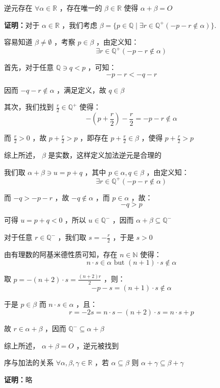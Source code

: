 \begin{theorem}{逆元存在}
$\forall\alpha\in\mathbb{R}$ ，存在唯一的 $\beta\in\mathbb{R}$ 使得 $\alpha+\beta=O$

\textbf{证明：}对于 $\alpha\in\mathbb{R}$ ，我们考虑 $\beta=\{p\in\mathbb{Q}\mid\exists r\in\mathbb{Q}^+(-p-r\notin\alpha)\}$.

容易知道 $\beta\neq \emptyset$ ，考察 $p\in\beta$ ，由定义知：
$$\exists r\in\mathbb{Q}^+(-p-r\notin\alpha)$$

首先，对于任意 $\mathbb{Q}\ni q<p$ ，可知：
$$-p-r<-q-r$$

因而 $-q-r\notin\alpha$ ，满足定义，故 $q\in\beta$

其次，我们找到 $\displaystyle{\frac{r}{2}\in\mathbb{Q}^+}$ 使得：
$$-\left(p+\frac{r}{2}\right)-\frac{r}{2}=-p-r\notin\alpha$$

而 $\displaystyle{\frac{r}{2}>0}$ ，故 $\displaystyle{p+\frac{r}{2}>p}$ ，即存在 $\displaystyle{p+\frac{r}{2}\in\beta}$ ，使得 $\displaystyle{p+\frac{r}{2}>p}$

综上所述， $\beta$ 是实数，这样定义加法逆元是合理的

我们取 $\alpha+\beta\ni u=p+q$ ，其中 $p\in\alpha,q\in\beta$ ，由定义知：
$$\exists r\in\mathbb{Q}^+(-p-r\notin\alpha)$$

而 $-q>-p-r$ ，故 $-q\notin \alpha$ ，而 $p\in\alpha$ ，故：
$$-q>p$$

可得 $u=p+q<0$ ，所以 $u\in\mathbb{Q}^-$ ，因而 $\alpha+\beta\subseteq\mathbb{Q}^-$

对于任意 $r\in\mathbb{Q}^-$ ，我们取 $\displaystyle{s=-\frac{r}{2}}$ ，于是 $s>0$

由有理数的阿基米德性质可知，存在 $n\in\mathbb{N}$ 使得：
$$n\cdot s\in\alpha\,\,\text{but}\,\,(n+1)\cdot s\notin \alpha$$

取 $\displaystyle{p=-(n+2)\cdot s=\frac{(n+2)r}2}$ ，则：
$$-p-s=(n+1)\cdot s\notin\alpha$$

于是 $p\in\beta$ 而 $n\cdot s\in\alpha$ ，且：
$$r=-2s=n\cdot s-(n+2)\cdot s=n\cdot s+p$$

故 $r\in\alpha+\beta$ ，因而 $\mathbb{Q}^-\subseteq\alpha+\beta$

综上所述， $\alpha+\beta=O$ ，逆元被找到
\end{theorem}
\begin{theorem}{序与加法的关系}
$\forall\alpha,\beta,\gamma\in\mathbb{R}$ ，若 $\alpha\subseteq\beta$ 则 $\alpha+\gamma\subseteq\beta+\gamma$

\textbf{证明：}略
\end{theorem} 
